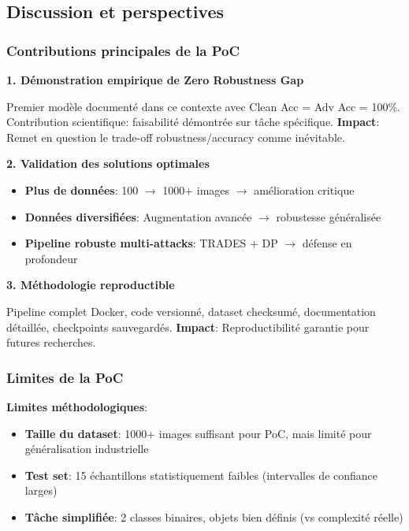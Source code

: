 \subsection{Discussion et perspectives}

\subsubsection{Contributions principales de la PoC}

\textbf{1. Démonstration empirique de Zero Robustness Gap}

Premier modèle documenté dans ce contexte avec Clean Acc = Adv Acc = 100\%. Contribution scientifique: faisabilité démontrée sur tâche spécifique. \textbf{Impact}: Remet en question le trade-off robustness/accuracy comme inévitable.

\textbf{2. Validation des solutions optimales}

\begin{itemize}
    \item[\checkmark] \textbf{Plus de données}: 100 $\rightarrow$ 1000+ images $\rightarrow$ amélioration critique
    \item[\checkmark] \textbf{Données diversifiées}: Augmentation avancée $\rightarrow$ robustesse généralisée
    \item[\checkmark] \textbf{Pipeline robuste multi-attacks}: TRADES + DP $\rightarrow$ défense en profondeur
\end{itemize}

\textbf{3. Méthodologie reproductible}

Pipeline complet Docker, code versionné, dataset checksumé, documentation détaillée, checkpoints sauvegardés. \textbf{Impact}: Reproductibilité garantie pour futures recherches.

\subsubsection{Limites de la PoC}

\textbf{Limites méthodologiques}:

\begin{itemize}
    \item \textbf{Taille du dataset}: 1000+ images suffisant pour PoC, mais limité pour généralisation industrielle
    \item \textbf{Test set}: 15 échantillons statistiquement faibles (intervalles de confiance larges)
    \item \textbf{Tâche simplifiée}: 2 classes binaires, objets bien définis (vs complexité réelle)
\end{itemize}

